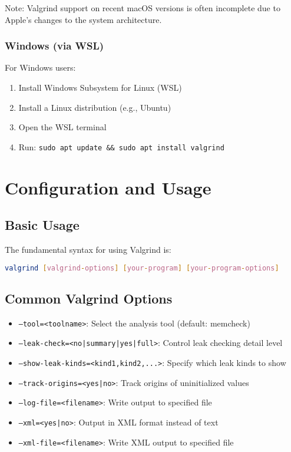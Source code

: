 \documentclass[11pt,a4paper]{article}
\begin{document}
Note: Valgrind support on recent macOS versions is often incomplete due to Apple's changes to the system architecture.

\subsubsection{Windows (via WSL)}
For Windows users:
\begin{enumerate}
    \item Install Windows Subsystem for Linux (WSL)
    \item Install a Linux distribution (e.g., Ubuntu)
    \item Open the WSL terminal
    \item Run: \texttt{sudo apt update \&\& sudo apt install valgrind}
\end{enumerate}

\section{Configuration and Usage}

\subsection{Basic Usage}
The fundamental syntax for using Valgrind is:

\begin{lstlisting}[caption=Basic Valgrind usage, language=bash]
valgrind [valgrind-options] [your-program] [your-program-options]
\end{lstlisting}

\subsection{Common Valgrind Options}
\begin{itemize}
    \item \texttt{--tool=<toolname>}: Select the analysis tool (default: memcheck)
    \item \texttt{--leak-check=<no|summary|yes|full>}: Control leak checking detail level
    \item \texttt{--show-leak-kinds=<kind1,kind2,...>}: Specify which leak kinds to show
    \item \texttt{--track-origins=<yes|no>}: Track origins of uninitialized values
    \item \texttt{--log-file=<filename>}: Write output to specified file
    \item \texttt{--xml=<yes|no>}: Output in XML format instead of text
    \item \texttt{--xml-file=<filename>}: Write XML output to specified file
\end{itemize}
\end{document}
